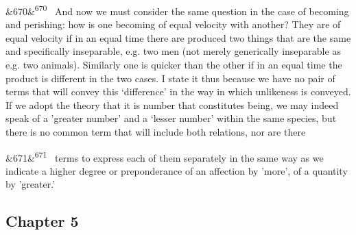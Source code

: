 \documentclass[12pt]{article}
\newcommand{\para}[1][]{\par\noindent\ifx&#1&\else\textsuperscript{\footnotesize #1}~\fi}
\begin{document}
\para[670] And now we must consider the same question in the case of becoming and perishing: how is one becoming of equal velocity with another? They are of equal velocity if in an equal time there are produced two things that are the same and specifically inseparable, e.g. two men (not merely generically inseparable as e.g. two animals). Similarly one is quicker than the other if in an equal time the product is different in the two cases. I state it thus because we have no pair of terms that will convey this ‘difference’ in the way in which unlikeness is conveyed. If we adopt the theory that it is number that constitutes being, we may indeed speak of a 'greater number’ and a ‘lesser number' within the same species, but there is no common term that will include both relations, nor are there

\para[671] terms to express each of them separately in the same way as we indicate a higher degree or preponderance of an affection by 'more', of a quantity by 'greater.'

\subsection*{Chapter 5}
\end{document}
